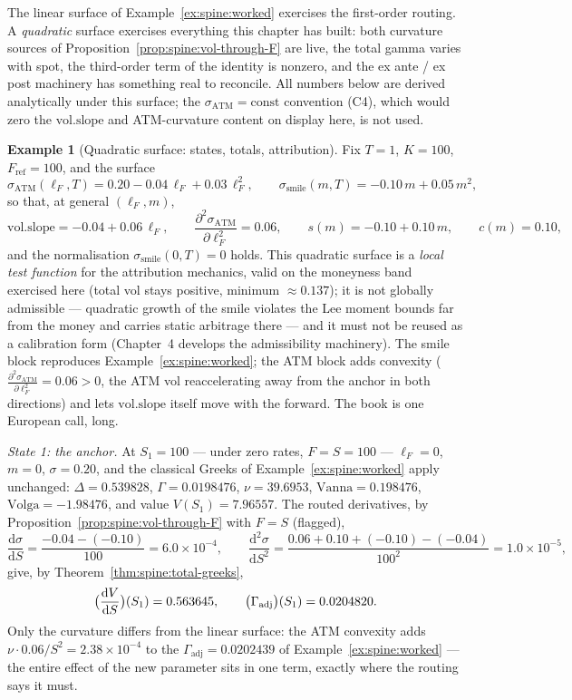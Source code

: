 \documentclass[11pt]{book}
\theoremstyle{plain}
\theoremstyle{definition}
\newtheorem{example}[theorem]{Example}
\theoremstyle{remark}
\newcommand{\mln}{m}                             %
\newcommand{\lF}{\ell_F}                         %
\newcommand{\Fref}{F_{\mathrm{ref}}}             %
\newcommand{\ssm}{\sigma_{\mathrm{smile}}}       %
\newcommand{\satm}{\sigma_{\mathrm{ATM}}}        %
\newcommand{\volslope}{\mathrm{vol.slope}}       %
\newcommand{\vega}{\nu}                          %
\newcommand{\Vanna}{\mathrm{Vanna}}
\newcommand{\Volga}{\mathrm{Volga}}
\newcommand{\Gadj}{\Gamma_{\mathrm{adj}}}        %
\newcommand{\dd}{\mathrm{d}}                                  %
\newcommand{\pdd}[2]{\frac{\partial^2 #1}{\partial #2^2}}     %
\newcommand{\td}[2]{\frac{\dd #1}{\dd #2}}                    %
\begin{document}
The linear surface of Example~\ref{ex:spine:worked} exercises the first-order
routing. A \emph{quadratic} surface exercises everything this chapter has
built: both curvature sources of
Proposition~\ref{prop:spine:vol-through-F} are live, the total gamma varies
with spot, the third-order term of the identity is nonzero, and the
ex ante / ex post machinery has something real to reconcile. All numbers
below are derived analytically under this surface; the
$\satm = \mathrm{const}$ convention (C4), which would zero the $\volslope$ and
ATM-curvature content on display here, is not used.

\begin{example}[Quadratic surface: states, totals, attribution]
\label{ex:ch3:quadratic}
Fix $T = 1$, $K = 100$, $\Fref = 100$, and the surface
\begin{equation}\label{eq:ch3:example-surface}
  \satm(\lF, T) = 0.20 - 0.04\,\lF + 0.03\,\lF^2,
  \qquad
  \ssm(\mln, T) = -0.10\,\mln + 0.05\,\mln^2 ,
\end{equation}
so that, at general $(\lF, \mln)$,
\[
  \volslope = -0.04 + 0.06\,\lF, \qquad
  \pdd{\satm}{\lF} = 0.06, \qquad
  s(\mln) = -0.10 + 0.10\,\mln, \qquad
  c(\mln) = 0.10 ,
\]
and the normalisation $\ssm(0,T) = 0$ holds. This
quadratic surface is a \emph{local test function} for the attribution
mechanics, valid on the moneyness band exercised here (total vol stays
positive, minimum $\approx 0.137$); it is not globally admissible ---
quadratic growth of the smile violates the Lee moment bounds far from the
money and carries static arbitrage there --- and it must not be reused as a
calibration form (Chapter~4 develops the admissibility machinery). The smile
block reproduces
Example~\ref{ex:spine:worked}; the ATM block adds convexity
($\pdd{\satm}{\lF} = 0.06 > 0$, the ATM vol reaccelerating away from the
anchor in both directions) and lets $\volslope$ itself move with the forward.
The book is one European call, long.

\emph{State 1: the anchor.} At $S_1 = 100$ --- under zero rates, $F = S =
100$ --- $\lF = 0$, $\mln = 0$, $\sigma = 0.20$, and the classical
Greeks of Example~\ref{ex:spine:worked} apply unchanged:
$\Delta = 0.539828$, $\Gamma = 0.0198476$, $\vega = 39.6953$,
$\Vanna = 0.198476$, $\Volga = -1.98476$, and value $V(S_1) = 7.96557$. The
routed derivatives, by Proposition~\ref{prop:spine:vol-through-F} with
$F = S$ (flagged),
\[
  \td{\sigma}{S} = \frac{-0.04 - (-0.10)}{100} = 6.0\times10^{-4},
  \qquad
  \frac{\dd^2\sigma}{\dd S^2}
  = \frac{0.06 + 0.10 + (-0.10) - (-0.04)}{100^2}
  = 1.0\times10^{-5} ,
\]
give, by Theorem~\ref{thm:spine:total-greeks},
\[
  \evalat{\td{V}{S}}{S_1} = 0.563645,
  \qquad
  \evalat{\Gadj}{S_1} = 0.0204820 .
\]
Only the curvature differs from the linear surface: the ATM convexity adds
$\vega \cdot 0.06 / S^2 = 2.38\times10^{-4}$ to the $\Gadj = 0.0202439$ of
Example~\ref{ex:spine:worked} --- the entire effect of the new parameter sits
in one term, exactly where the routing says it must.


\end{example}
\end{document}

